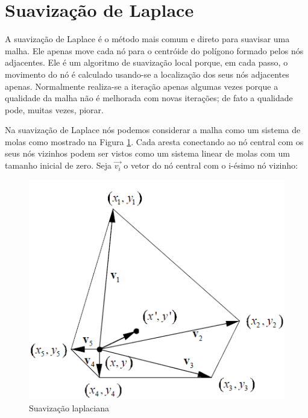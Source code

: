 

\section{Suavização de Laplace}

A suavização de Laplace é o método mais comum e direto para suavisar uma malha. Ele apenas move cada nó para o centróide do polígono formado pelos nós adjacentes. Ele é um algoritmo de suavização local porque, em cada passo, o movimento do nó é calculado usando-se a localização dos seus nós adjacentes apenas. Normalmente realiza-se a iteração apenas algumas vezes porque a qualidade da malha não é melhorada com novas iterações; de fato a qualidade pode, muitas vezes, piorar. \cite{Zhou}

Na suavização de Laplace nós podemos considerar a malha como um sistema de molas como mostrado na Figura \ref{fig:laplacian_smoothing}. Cada aresta conectando ao nó central com os seus nós vizinhos podem ser vistos como um sistema linear de molas com um tamanho inicial de zero. Seja $\vec{v_i}$ o vetor do nó central com o i-ésimo nó vizinho:

\begin{figure}
    \centering
    \includegraphics{fig/laplacian-smoothing.png}
    \caption{Suavização laplaciana}
    \label{fig:laplacian_smoothing}
\end{figure}


